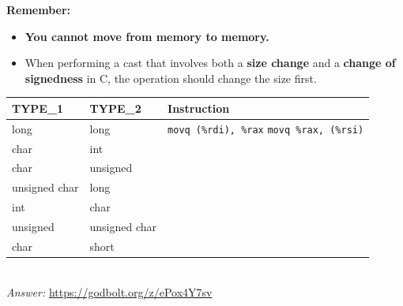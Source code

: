 \documentclass{article}
\begin{document}
\textbf{Remember:}
\begin{itemize}
    \item \textbf{You cannot move from memory to memory.}
    \item When performing a cast that involves both a \textbf{size change} and a \textbf{change of signedness} in C, the operation should change the size first.
\end{itemize}

\vspace{10pt}

\begin{table}[h]
    \centering
    \small
    \renewcommand{\arraystretch}{1.4} %
    \begin{tabular}{l l p{5cm}} %
        \toprule
        \textbf{TYPE\_1} & \textbf{TYPE\_2} & \textbf{Instruction} \\
        \midrule
        long & long & \texttt{movq (\%rdi), \%rax} \newline \texttt{movq \%rax, (\%rsi)} \\
        char & int & \underline{\hspace{5cm}} \newline \underline{\hspace{5cm}} \\
        char & unsigned & \underline{\hspace{5cm}} \newline \underline{\hspace{5cm}} \\
        unsigned char & long & \underline{\hspace{5cm}} \newline \underline{\hspace{5cm}} \\
        int & char & \underline{\hspace{5cm}} \newline \underline{\hspace{5cm}} \\
        unsigned & unsigned char & \underline{\hspace{5cm}} \newline \underline{\hspace{5cm}} \\
        char & short & \underline{\hspace{5cm}} \newline \underline{\hspace{5cm}} \\
        \bottomrule
    \end{tabular}
\end{table}
\\
\textit{Answer: }\url{https://godbolt.org/z/ePox4Y7sv}
\clearpage
\end{document}
